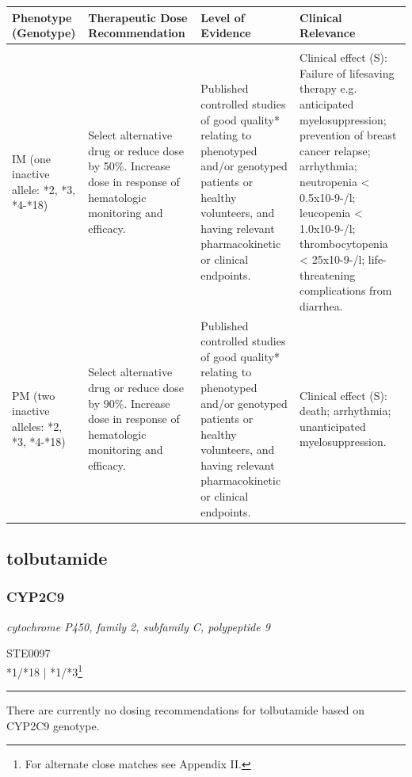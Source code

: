\documentclass{report}
\begin{document}
      \begin{tabularx}{\textwidth}{ XXXX }
      \textbf{ Phenotype (Genotype) }&\textbf{ Therapeutic Dose Recommendation }&\textbf{ Level of Evidence }&\textbf{ Clinical Relevance } \\ \hline \\  IM (one inactive allele: *2, *3, *4-*18) & Select alternative drug or reduce dose by 50\%. Increase dose in response of hematologic monitoring and efficacy. & Published controlled studies of good quality* relating to phenotyped and/or genotyped patients or healthy volunteers, and having relevant pharmacokinetic or clinical endpoints. & Clinical effect (S): Failure of lifesaving therapy e.g. anticipated myelosuppression; prevention of breast cancer relapse; arrhythmia; neutropenia < 0.5x10-9-/l; leucopenia < 1.0x10-9-/l; thrombocytopenia < 25x10-9-/l; life-threatening complications from diarrhea.  \\  PM (two inactive alleles: *2, *3, *4-*18) & Select alternative drug or reduce dose by 90\%. Increase dose in response of hematologic monitoring and efficacy. & Published controlled studies of good quality* relating to phenotyped and/or genotyped patients or healthy volunteers, and having relevant pharmacokinetic or clinical endpoints. & Clinical effect (S): death; arrhythmia; unanticipated myelosuppression.  \\ 
      \end{tabularx}
      
      \newpage
      \normalsize









\subsection{ tolbutamide }

\subsubsection{ CYP2C9 }
     \textit{ cytochrome P450, family 2, subfamily C, polypeptide 9 } \begin{flushright} \textsc{ STE0097 \\ *1/*18  | *1/*3\footnote{For alternate close matches see Appendix II.} }\end{flushright}
      \hrule \vspace{6pt}
      There are currently no dosing recommendations for tolbutamide based on CYP2C9 genotype. \newline
      \scriptsize
      
\end{document}
